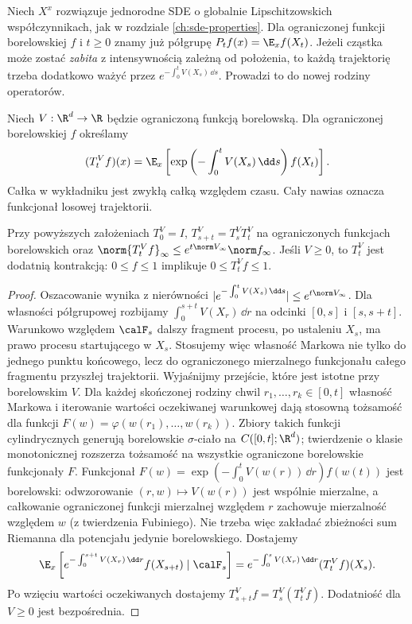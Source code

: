 Niech $X^x$ rozwiązuje jednorodne SDE o globalnie
Lipschitzowskich współczynnikach, jak w
rozdziale \ref{ch:sde-properties}. Dla ograniczonej
funkcji borelowskiej $f$ i $t\ge0$ znamy już półgrupę
$P_tf(x)=\E_xf(X_t)$. Jeżeli cząstka może zostać
\emph{zabita} z intensywnością zależną od położenia,
to każdą trajektorię trzeba dodatkowo ważyć przez
$e^{-\int_0^tV(X_s)\,\dd s}$. Prowadzi to do
nowej rodziny operatorów.

\begin{definicja}
\label{def:fk-semigroup}
Niech $V:\R^d\to\R$ będzie ograniczoną funkcją
borelowską. Dla ograniczonej borelowskiej $f$ określamy
\[
(T_t^Vf)(x)=\E_x\left[
\exp\left(-\int_0^tV(X_s)\,\dd s\right)f(X_t)\right].
\]
Całka w wykładniku jest zwykłą całką względem czasu.
Cały nawias oznacza funkcjonał losowej trajektorii.
\end{definicja}

\begin{twierdzenie}
\label{th:fk-semigroup}
Przy powyższych założeniach $T_0^V=I$,
$T_{s+t}^V=T_s^VT_t^V$ na ograniczonych
funkcjach borelowskich oraz
$\norm{T_t^Vf}_\infty\le e^{t\norm V_\infty}\norm f_\infty$.
Jeśli $V\ge0$, to $T_t^V$ jest dodatnią kontrakcją:
$0\le f\le1$ implikuje $0\le T_t^Vf\le1$.
\end{twierdzenie}
\begin{proof}
Oszacowanie wynika z nierówności
$|e^{-\int_0^t V(X_s)\,\dd s}|\le e^{t\norm V_\infty}$.
Dla własności półgrupowej rozbijamy
$\int_0^{s+t}V(X_r)\,\dd r$ na odcinki
$[0,s]$ i $[s,s+t]$. Warunkowo względem $\calF_s$
dalszy fragment procesu, po ustaleniu $X_s$, ma
prawo procesu startującego w $X_s$.
Stosujemy więc własność Markowa nie tylko do
jednego punktu końcowego, lecz do ograniczonego
mierzalnego funkcjonału całego fragmentu przyszłej trajektorii.
Wyjaśnijmy przejście, które jest istotne przy borelowskim $V$.
Dla każdej skończonej rodziny chwil $r_1,\ldots,r_k\in[0,t]$
własność Markowa i iterowanie wartości oczekiwanej warunkowej
dają stosowną tożsamość dla funkcji
$F(w)=\varphi(w(r_1),\ldots,w(r_k))$.
Zbiory takich funkcji cylindrycznych generują borelowskie
$\sigma$-ciało na $C([0,t];\R^d)$; twierdzenie o klasie
monotonicznej rozszerza tożsamość na wszystkie ograniczone
borelowskie funkcjonały $F$. Funkcjonał
$F(w)=\exp(-\int_0^tV(w(r))\,\dd r)f(w(t))$
jest borelowski: odwzorowanie $(r,w)\mapsto V(w(r))$
jest wspólnie mierzalne, a całkowanie ograniczonej funkcji
mierzalnej względem $r$ zachowuje mierzalność względem $w$
(z twierdzenia Fubiniego). Nie trzeba więc zakładać
zbieżności sum Riemanna dla potencjału jedynie borelowskiego.
Dostajemy
\[
\E_x\left[e^{-\int_0^{s+t}V(X_r)\,\dd r}f(X_{s+t})
\mid\calF_s\right]
=e^{-\int_0^sV(X_r)\,\dd r}(T_t^Vf)(X_s).
\]
Po wzięciu wartości oczekiwanych dostajemy
$T_{s+t}^Vf=T_s^V(T_t^Vf)$. Dodatniość dla $V\ge0$
jest bezpośrednia.
\end{proof}

